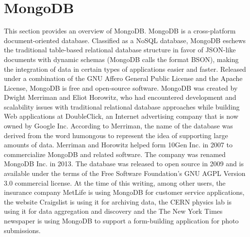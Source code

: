 \section{MongoDB}
\label{sec:mongodb}
This section provides an overview of MongoDB.
\newline
MongoDB is a cross-platform document-oriented database. Classified as a NoSQL database, MongoDB eschews the traditional table-based relational database structure in favor of JSON-like documents with dynamic schemas (MongoDB calls the format BSON), making the integration of data in certain types of applications easier and faster. Released under a combination of the GNU Affero General Public License and the Apache License, MongoDB is free and open-source software.
\newline
MongoDB was created by Dwight Merriman and Eliot Horowitz, who had encountered development and scalability issues with traditional relational database approaches while building Web applications at DoubleClick, an Internet advertising company that is now owned by Google Inc. According to Merriman, the name of the database was derived from the word humongous to represent the idea of supporting large amounts of data. Merriman and Horowitz helped form 10Gen Inc. in 2007 to commercialize MongoDB and related software. The company was renamed MongoDB Inc. in 2013.
\newline
The database was released to open source in 2009 and is available under the terms of the Free Software Foundation’s GNU AGPL Version 3.0 commercial license. At the time of this writing, among other users, the insurance company MetLife is using MongoDB for customer service applications, the website Craigslist is using it for archiving data, the CERN physics lab is using it for data aggregation and discovery and the The New York Times newspaper is using MongoDB to support a form-building application for photo submissions.